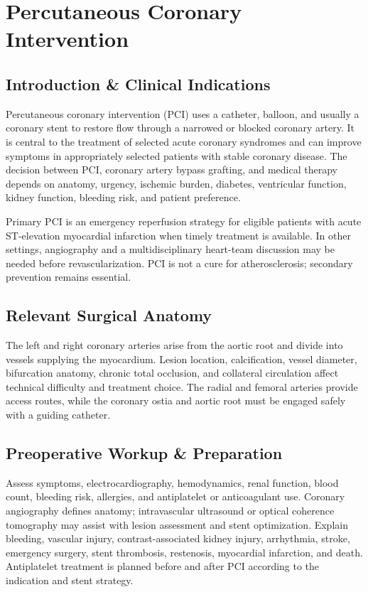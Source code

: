 \chapter{Percutaneous Coronary Intervention}

\section*{Introduction \& Clinical Indications}
Percutaneous coronary intervention (PCI) uses a catheter, balloon, and usually a coronary stent to restore flow through a narrowed or blocked coronary artery. It is central to the treatment of selected acute coronary syndromes and can improve symptoms in appropriately selected patients with stable coronary disease. The decision between PCI, coronary artery bypass grafting, and medical therapy depends on anatomy, urgency, ischemic burden, diabetes, ventricular function, kidney function, bleeding risk, and patient preference.

Primary PCI is an emergency reperfusion strategy for eligible patients with acute ST-elevation myocardial infarction when timely treatment is available. In other settings, angiography and a multidisciplinary heart-team discussion may be needed before revascularization. PCI is not a cure for atherosclerosis; secondary prevention remains essential.

\section*{Relevant Surgical Anatomy}
The left and right coronary arteries arise from the aortic root and divide into vessels supplying the myocardium. Lesion location, calcification, vessel diameter, bifurcation anatomy, chronic total occlusion, and collateral circulation affect technical difficulty and treatment choice. The radial and femoral arteries provide access routes, while the coronary ostia and aortic root must be engaged safely with a guiding catheter.

\section*{Preoperative Workup \& Preparation}
Assess symptoms, electrocardiography, hemodynamics, renal function, blood count, bleeding risk, allergies, and antiplatelet or anticoagulant use. Coronary angiography defines anatomy; intravascular ultrasound or optical coherence tomography may assist with lesion assessment and stent optimization. Explain bleeding, vascular injury, contrast-associated kidney injury, arrhythmia, stroke, emergency surgery, stent thrombosis, restenosis, myocardial infarction, and death. Antiplatelet treatment is planned before and after PCI according to the indication and stent strategy.

